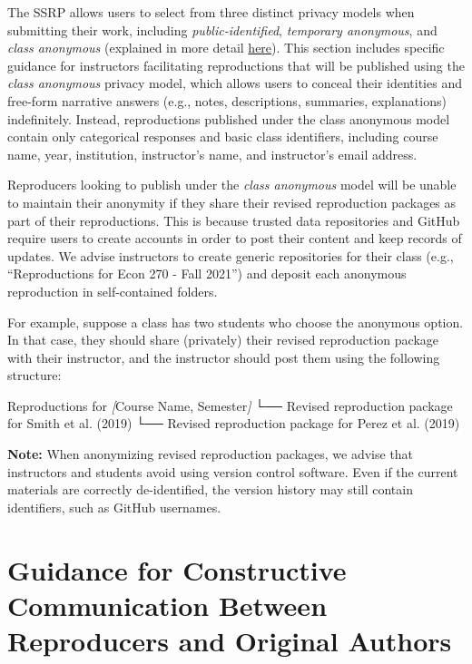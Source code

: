 \documentclass[
  openany]{book}
\newenvironment{Shaded}{\begin{snugshade}}{\end{snugshade}}
\newcommand{\CommentTok}[1]{\textcolor[rgb]{0.56,0.35,0.01}{\textit{#1}}}
\newcommand{\NormalTok}[1]{#1}
\newcommand{\OtherTok}[1]{\textcolor[rgb]{0.56,0.35,0.01}{#1}}
\begin{document}
The SSRP allows users to select from three distinct privacy models when submitting their work, including \emph{public-identified}, \emph{temporary anonymous}, and \emph{class anonymous} (explained in more detail \href{https://bitss.github.io/ACRE/concluding-the-reproduction.html\#visibility-and-data-use}{here}). This section includes specific guidance for instructors facilitating reproductions that will be published using the \emph{class anonymous} privacy model, which allows users to conceal their identities and free-form narrative answers (e.g., notes, descriptions, summaries, explanations) indefinitely. Instead, reproductions published under the class anonymous model contain only categorical responses and basic class identifiers, including course name, year, institution, instructor's name, and instructor's email address.

Reproducers looking to publish under the \emph{class anonymous} model will be unable to maintain their anonymity if they share their revised reproduction packages as part of their reproductions. This is because trusted data repositories and GitHub require users to create accounts in order to post their content and keep records of updates. We advise instructors to create generic repositories for their class (e.g., ``Reproductions for Econ 270 - Fall 2021'') and deposit each anonymous reproduction in self-contained folders.

For example, suppose a class has two students who choose the anonymous option. In that case, they should share (privately) their revised reproduction package with their instructor, and the instructor should post them using the following structure:

\begin{Shaded}
\begin{Highlighting}[]
\NormalTok{  Reproductions for }\CommentTok{[}\OtherTok{Course Name, Semester}\CommentTok{]}
\NormalTok{    └── Revised reproduction package for Smith et al. (2019)}
\NormalTok{    └── Revised reproduction package for Perez et al. (2019)}
\end{Highlighting}
\end{Shaded}

\textbf{Note:} When anonymizing revised reproduction packages, we advise that instructors and students avoid using version control software. Even if the current materials are correctly de-identified, the version history may still contain identifiers, such as GitHub usernames.

\hypertarget{comunications}{%
\chapter{Guidance for Constructive Communication Between Reproducers and Original Authors}\label{comunications}}
\end{document}
